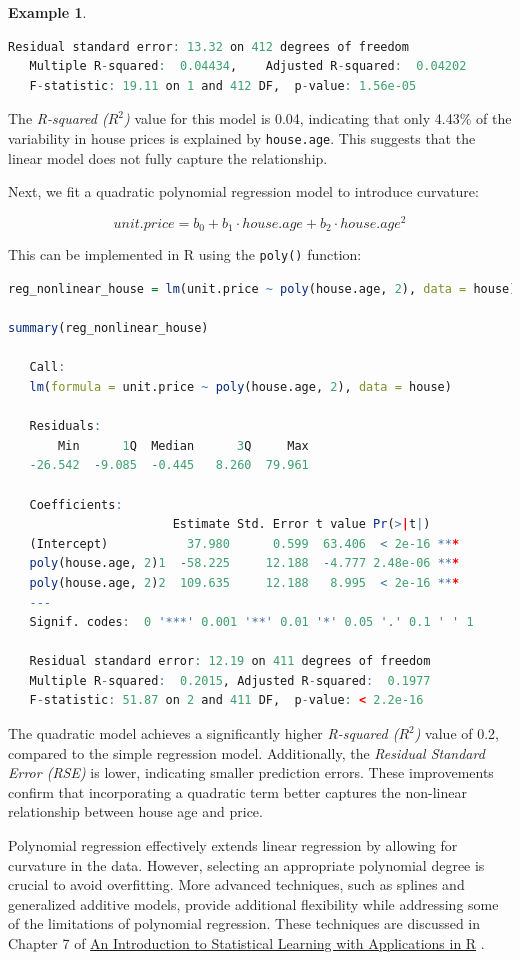 \documentclass[
]{book}
\newcommand{\passthrough}[1]{#1}
\theoremstyle{definition}
\theoremstyle{definition}
\newtheorem{example}{Example}[chapter]
\theoremstyle{definition}
\theoremstyle{definition}
\theoremstyle{remark}
\begin{document}
\begin{example}
\begin{lstlisting}[language=R]
   Residual standard error: 13.32 on 412 degrees of freedom
   Multiple R-squared:  0.04434,    Adjusted R-squared:  0.04202 
   F-statistic: 19.11 on 1 and 412 DF,  p-value: 1.56e-05
\end{lstlisting}

The \emph{R-squared (\(R^2\))} value for this model is 0.04, indicating that only 4.43\% of the variability in house prices is explained by \passthrough{\lstinline!house.age!}. This suggests that the linear model does not fully capture the relationship.

Next, we fit a quadratic polynomial regression model to introduce curvature:

\[
unit.price = b_0 + b_1 \cdot house.age + b_2 \cdot house.age^2
\]

This can be implemented in R using the \passthrough{\lstinline!poly()!} function:

\begin{lstlisting}[language=R]
reg_nonlinear_house = lm(unit.price ~ poly(house.age, 2), data = house)

summary(reg_nonlinear_house)
   
   Call:
   lm(formula = unit.price ~ poly(house.age, 2), data = house)
   
   Residuals:
       Min      1Q  Median      3Q     Max 
   -26.542  -9.085  -0.445   8.260  79.961 
   
   Coefficients:
                       Estimate Std. Error t value Pr(>|t|)    
   (Intercept)           37.980      0.599  63.406  < 2e-16 ***
   poly(house.age, 2)1  -58.225     12.188  -4.777 2.48e-06 ***
   poly(house.age, 2)2  109.635     12.188   8.995  < 2e-16 ***
   ---
   Signif. codes:  0 '***' 0.001 '**' 0.01 '*' 0.05 '.' 0.1 ' ' 1
   
   Residual standard error: 12.19 on 411 degrees of freedom
   Multiple R-squared:  0.2015, Adjusted R-squared:  0.1977 
   F-statistic: 51.87 on 2 and 411 DF,  p-value: < 2.2e-16
\end{lstlisting}

The quadratic model achieves a significantly higher \emph{R-squared (\(R^2\))} value of 0.2, compared to the simple regression model. Additionally, the \emph{Residual Standard Error (RSE)} is lower, indicating smaller prediction errors. These improvements confirm that incorporating a quadratic term better captures the non-linear relationship between house age and price.
\end{example}

Polynomial regression effectively extends linear regression by allowing for curvature in the data. However, selecting an appropriate polynomial degree is crucial to avoid overfitting. More advanced techniques, such as splines and generalized additive models, provide additional flexibility while addressing some of the limitations of polynomial regression. These techniques are discussed in Chapter 7 of \href{https://www.statlearning.com}{An Introduction to Statistical Learning with Applications in R} \citep{gareth2013introduction}.
\end{document}
